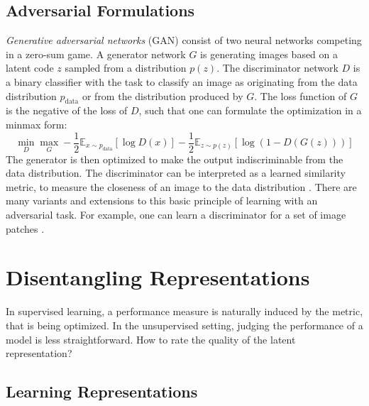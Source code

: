 	\subsection{Adversarial Formulations}\label{sec:adversarial}
		\textit{Generative adversarial networks} (GAN) \cite{goodfellow14gan} consist of two neural networks competing in a zero-sum game. A generator network $G$ is generating images based on a latent code $z$ sampled from a distribution $p(z)$. The discriminator network $D$ is a binary classifier with the task to classify an image as originating from the data distribution $p_{\mathrm{data}}$ or from the distribution produced by $G$. The loss function of $G$ is the negative of the loss of $D$, such that one can formulate the optimization in a minmax form:
		\begin{equation}
			\min_D \max_G - \frac{1}{2} \mathds{E}_{x \sim p_{\mathrm{data}}} [\log D(x)] - \frac{1}{2} \mathds{E}_{z\sim p(z)}[\log (1-D(G(z)))]
		\end{equation}
		The generator is then optimized to make the output indiscriminable from the data distribution.
		The discriminator can be interpreted as a learned similarity metric, to measure the closeness of an image to the data distribution \cite{larsen15vaegan}.
		There are many variants and extensions to this basic principle of learning with an adversarial task. For example, one can learn a discriminator for a set of image patches \cite{isola17image2image}. 

\section{Disentangling Representations}\label{sec:disentangled}
	In supervised learning, a performance measure is naturally induced by the metric, that is being optimized. In the unsupervised setting, judging the performance of a model is less straightforward.
	How to rate the quality of the latent representation?

	\subsection{Learning Representations}

